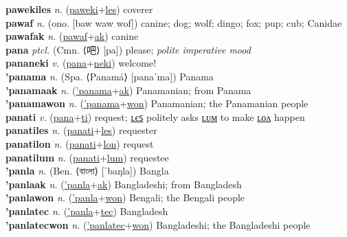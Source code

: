 \textbf{pawekiles} \textit{n.} (\hyperref[paweki]{paweki}+\hyperref[les]{les})
coverer \label{pawekiles} \\
\textbf{pawaf} \textit{n.} (ono. [baw waw wof])
canine; dog; wolf; dingo; fox; pup; cub; Canidae \label{pawaf} \\
\textbf{pawafak} \textit{n.} (\hyperref[pawaf]{pawaf}+\hyperref[ak]{ak})
canine \label{pawafak} \\
\textbf{pana} \textit{ptcl.} (Cmn. ⟨吧⟩ [pa])
please; \textit{polite imperative mood} \label{pana} \\
\textbf{pananeki} \textit{v.} (\hyperref[pana]{pana}+\hyperref[neki]{neki})
welcome! \label{pananeki} \\
\textbf{'panama} \textit{n.} (Spa. ⟨Panamá⟩ [panaˈma])
Panama \label{'panama} \\
\textbf{'panamaak} \textit{n.} (\hyperref['panama]{'panama}+\hyperref[ak]{ak})
Panamanian; from Panama \label{'panamaak} \\
\textbf{'panamawon} \textit{n.} (\hyperref['panama]{'panama}+\hyperref[won]{won})
Panamanian; the Panamanian people \label{'panamawon} \\
\textbf{panati} \textit{v.} (\hyperref[pana]{pana}+\hyperref[ti]{ti})
request; \hyperref[panatiles]{ʟєꜱ} politely asks \hyperref[panatilum]{ʟᴜᴍ} to make \hyperref[panatilon]{ʟᴏᴧ} happen \label{panati} \\
\textbf{panatiles} \textit{n.} (\hyperref[panati]{panati}+\hyperref[les]{les})
requester \label{panatiles} \\
\textbf{panatilon} \textit{n.} (\hyperref[panati]{panati}+\hyperref[lon]{lon})
request \label{panatilon} \\
\textbf{panatilum} \textit{n.} (\hyperref[panati]{panati}+\hyperref[lum]{lum})
requestee \label{panatilum} \\
\textbf{'panla} \textit{n.} (Ben. ⟨বাংলা⟩ [ˈbaŋla])
Bangla \label{'panla} \\
\textbf{'panlaak} \textit{n.} (\hyperref['panla]{'panla}+\hyperref[ak]{ak})
Bangladeshi; from Bangladesh \label{'panlaak} \\
\textbf{'panlawon} \textit{n.} (\hyperref['panla]{'panla}+\hyperref[won]{won})
Bengali; the Bengali people \label{'panlawon} \\
\textbf{'panlatec} \textit{n.} (\hyperref['panla]{'panla}+\hyperref[tec]{tec})
Bangladesh \label{'panlatec} \\
\textbf{'panlatecwon} \textit{n.} (\hyperref['panlatec]{'panlatec}+\hyperref[won]{won})
Bangladeshi; the Bangladeshi people \label{'panlatecwon} \\
